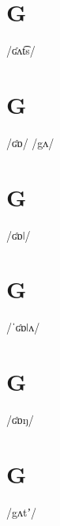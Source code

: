 \documentclass[10pt,a4paper,twoside]{book}
\begin{document}
\section*{G}

\begin{multicols}{3}
 {/ʛʌt͡s/} {}
\end{multicols}

\section*{G}

\begin{multicols}{3}
 {/ʛɒ/} {}
 {/gʌ/} {}
\end{multicols}

\section*{G}

\begin{multicols}{3}
 {/ʛɒǀ/} {}
\end{multicols}

\section*{G}

\begin{multicols}{3}
 {/ˈʛɒǀʌ/} {}
\end{multicols}

\section*{G}

\begin{multicols}{3}
 {/ʛɒŋ/} {}
\end{multicols}

\section*{G}

\begin{multicols}{3}
 {/gʌtʼ/} {}
\end{multicols}
\end{document}
